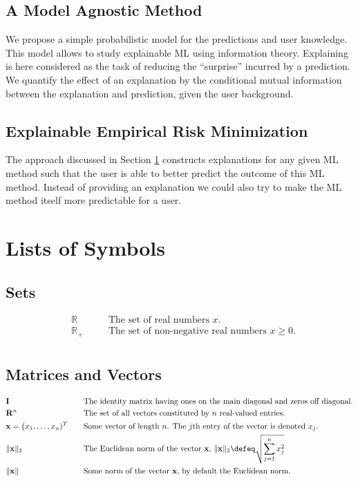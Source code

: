 \documentclass[12pt]{report}
\begin{document}
\section{A Model Agnostic Method}
\label{sec_model_agn_xml}

We propose a simple probabilistic model for the predictions and 
user knowledge. This model allows to study explainable ML using 
information theory. Explaining is here considered as the task of 
reducing the ``surprise'' incurred by a prediction. We quantify 
the effect of an explanation by the conditional mutual information 
between the explanation and prediction, given the user background. 

\section{Explainable Empirical Risk Minimization} 
The approach discussed in Section \ref{sec_model_agn_xml} constructs explanations 
for any given ML method such that the user is able to better predict 
the outcome of this ML method. Instead of providing an explanation 
we could also try to make the ML method itself more predictable for 
a user. 


\chapter{Lists of Symbols}
\label{ch_list_of_symbols}

\section{Sets} 
\begin{align} 
&\mathbb{R}  &\quad &\mbox{The set of real numbers $x$.} \nonumber \\
&\mathbb{R}_{+}  &\quad &\mbox{The set of non-negative real numbers $x\geq0$.} \nonumber \\ \nonumber
\end{align} 

\section{Matrices and Vectors} 
\begin{align} 
&\mathbf{I}  &\quad &\mbox{The identity matrix having ones on the main diagonal and zeros off diagonal.} \nonumber \\
&\mathbf{R}^{n}  &\quad &\mbox{The set of all vectors constituted by $n$ real-valued entries.} \nonumber \\
&\mathbf{x}=\big(x_{1},\ldots,x_{n})^{T}  &\quad &\mbox{Some vector of length $n$. The $j$th entry of the vector is denoted $x_{j}$.} \nonumber \\
&\| \mathbf{x}\|_{2}  &\quad &\mbox{The Euclidean norm of the vector $\mathbf{x}$, } \| \mathbf{x}\|_{2} \defeq \sqrt{\sum_{j=1}^{n} x_{j}^{2}}  \nonumber \\
&\| \mathbf{x}\|  &\quad &\mbox{Some norm of the vector $\mathbf{x}$, by default the Euclidean norm. }  \nonumber 
\end{align} 
\end{document}
